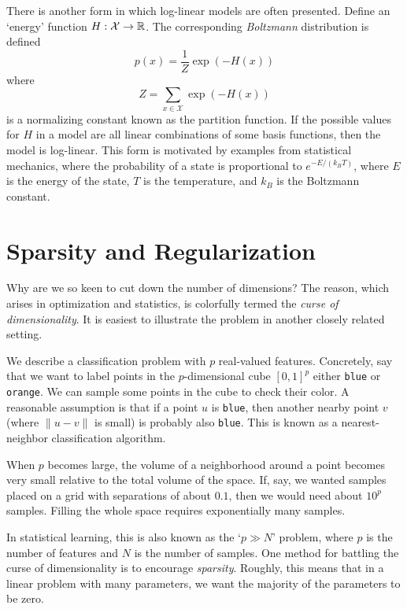 \documentclass[cclicense]{hmcthesis}
\providecommand*{\xs}{\mathcal X}
\numberwithin{equation}{chapter}
\numberwithin{thmcounter}{chapter}
\begin{document}
    There is another form in which log-linear models are often presented.
    Define an `energy' function $H: \xs \to \R$.  The corresponding
    \emph{Boltzmann} distribution is defined
    \[
        p(x) = \frac 1 Z \exp(-H(x))
    \]
    where
    \[
        Z = \sum_{x \in \xs} \exp(-H(x))
    \]
    is a normalizing constant known as the partition function.  If the possible
    values for $H$ in a model are all linear combinations of some basis
    functions, then the model is log-linear.  This form is motivated by examples
    from statistical mechanics, where the probability of a state is proportional
    to $e^{-E/(k_BT)}$, where $E$ is the energy of the state, $T$ is the
    temperature, and $k_B$ is the Boltzmann constant.

\section{Sparsity and Regularization}
    \label{sec:regularization}

    Why are we so keen to cut down the number of dimensions?  The reason, which
    arises in optimization and statistics, is colorfully termed the \emph{curse
    of dimensionality}.  It is easiest to illustrate the problem in another
    closely related setting.

    \begin{example}
        We describe a classification problem with $p$ real-valued features.
        Concretely, say that we want to label points in the $p$-dimensional cube
        $[0, 1]^p$ either \texttt{blue} or \texttt{orange}.  We can sample some
        points in the cube to check their color.  A reasonable assumption is
        that if a point $u$ is \texttt{blue}, then another nearby point $v$
        (where $\|u - v\|$ is small) is probably also \texttt{blue}.  This is
        known as a nearest-neighbor classification algorithm.  
        
        When $p$ becomes large, the volume of a neighborhood around a point
        becomes very small relative to the total volume of the space.  If, say,
        we wanted samples placed on a grid with separations of about $0.1$, then
        we would need about $10^p$ samples.  Filling the whole space requires
        exponentially many samples.
    \end{example}

    In statistical learning, this is also known as the `$p \gg N$' problem,
    where $p$ is the number of features and $N$ is the number of samples.  One
    method for battling the curse of dimensionality is to encourage
    \emph{sparsity}.  Roughly, this means that in a linear problem with many
    parameters, we want the majority of the parameters to be zero.
    
\end{document}
